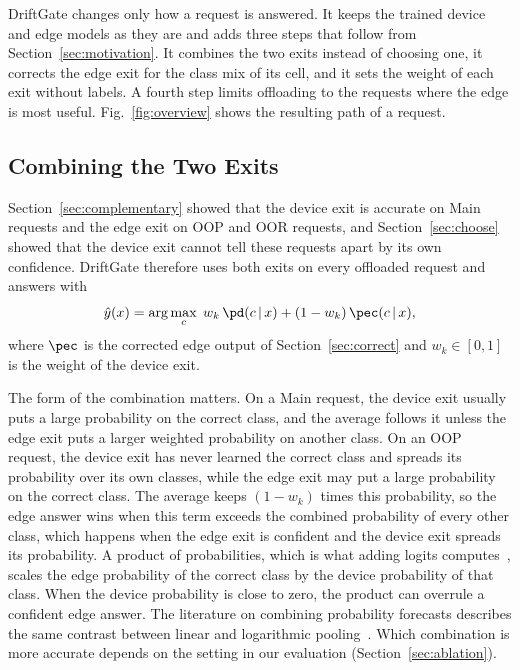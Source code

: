 DriftGate changes only how a request is answered. It keeps the trained device and edge models as they are and adds three steps that follow from Section~\ref{sec:motivation}. It combines the two exits instead of choosing one, it corrects the edge exit for the class mix of its cell, and it sets the weight of each exit without labels. A fourth step limits offloading to the requests where the edge is most useful. Fig.~\ref{fig:overview} shows the resulting path of a request.

\subsection{Combining the Two Exits}
\label{sec:combine}

Section~\ref{sec:complementary} showed that the device exit is accurate on Main requests and the edge exit on OOP and OOR requests, and Section~\ref{sec:choose} showed that the device exit cannot tell these requests apart by its own confidence. DriftGate therefore uses both exits on every offloaded request and answers with
\begin{equation}
\hat y(x)=\arg\max_c\; w_k\,\pd(c\,|\,x)+(1-w_k)\,\pec(c\,|\,x),
\label{eq:combine}
\end{equation}
where $\pec$ is the corrected edge output of Section~\ref{sec:correct} and $w_k\in[0,1]$ is the weight of the device exit.

The form of the combination matters. On a Main request, the device exit usually puts a large probability on the correct class, and the average follows it unless the edge exit puts a larger weighted probability on another class. On an OOP request, the device exit has never learned the correct class and spreads its probability over its own classes, while the edge exit may put a large probability on the correct class. The average keeps $(1-w_k)$ times this probability, so the edge answer wins when this term exceeds the combined probability of every other class, which happens when the edge exit is confident and the device exit spreads its probability. A product of probabilities, which is what adding logits computes~\cite{chen2022fedrod,wolczyk2021ztw}, scales the edge probability of the correct class by the device probability of that class. When the device probability is close to zero, the product can overrule a confident edge answer. The literature on combining probability forecasts describes the same contrast between linear and logarithmic pooling~\cite{genest1986combining}. Which combination is more accurate depends on the setting in our evaluation (Section~\ref{sec:ablation}).

